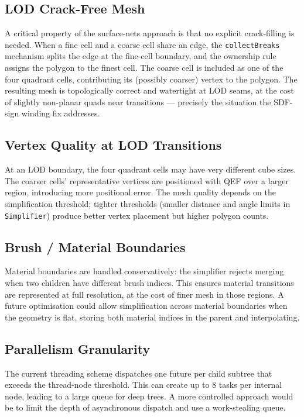 \documentclass[10pt,a4paper]{article}
\begin{document}
\subsection{LOD Crack-Free Mesh}

A critical property of the surface-nets approach is that no explicit
crack-filling is needed.  When a fine cell and a coarse cell share an
edge, the \lstinline{collectBreaks} mechanism splits the edge at the
fine-cell boundary, and the ownership rule assigns the polygon to the
finest cell.  The coarse cell is included as one of the four quadrant
cells, contributing its (possibly coarser) vertex to the polygon.  The
resulting mesh is topologically correct and watertight at LOD seams,
at the cost of slightly non-planar quads near transitions — precisely
the situation the SDF-sign winding fix addresses.

\subsection{Vertex Quality at LOD Transitions}

At an LOD boundary, the four quadrant cells may have very different cube
sizes.  The coarser cells' representative vertices are positioned with
QEF over a larger region, introducing more positional error.  The mesh
quality depends on the simplification threshold; tighter thresholds
(smaller distance and angle limits in \lstinline{Simplifier}) produce
better vertex placement but higher polygon counts.

\subsection{Brush / Material Boundaries}

Material boundaries are handled conservatively: the simplifier rejects
merging when two children have different brush indices.  This ensures
material transitions are represented at full resolution, at the cost of
finer mesh in those regions.  A future optimisation could allow
simplification across material boundaries when the geometry is flat,
storing both material indices in the parent and interpolating.

\subsection{Parallelism Granularity}

The current threading scheme dispatches one future per child subtree that
exceeds the thread-node threshold.  This can create up to 8 tasks per
internal node, leading to a large queue for deep trees.  A more
controlled approach would be to limit the depth of asynchronous
dispatch and use a work-stealing queue.
\end{document}
